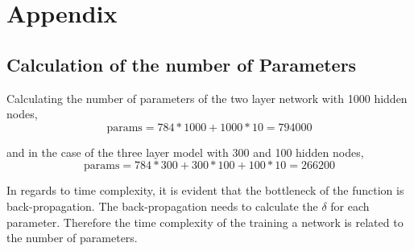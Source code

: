 \documentclass[12pt, twocolumn]{article}
\begin{document}


\section{Appendix}
\subsection{Calculation of the number of Parameters}
 Calculating the number of parameters of the two layer network with 1000 hidden nodes, 
\begin{equation*}
\textrm{params} = 784*1000 + 1000* 10 = 794000
\end{equation*}

and in the case of the three layer model with 300 and 100 hidden nodes,
\begin{equation*}
\textrm{params} = 784*300 + 300*100 + 100* 10 = 266200
\end{equation*}
 
In regards to time complexity, it is evident that the bottleneck of the function is back-propagation. The back-propagation needs to calculate the $\delta$ for each parameter. Therefore the time complexity of the training a network is related to the number of parameters.
\end{document}
